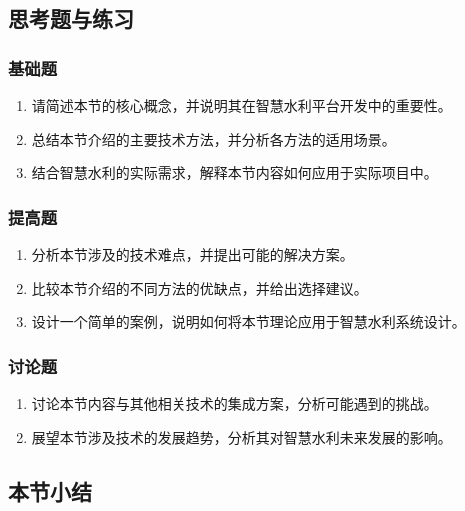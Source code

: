 \subsection{思考题与练习}\label{ux601dux8003ux9898ux4e0eux7ec3ux4e60}

\subsubsection{基础题}\label{ux57faux7840ux9898}

\begin{enumerate}
\def\labelenumi{\arabic{enumi}.}
\tightlist
\item
  请简述本节的核心概念，并说明其在智慧水利平台开发中的重要性。
\item
  总结本节介绍的主要技术方法，并分析各方法的适用场景。
\item
  结合智慧水利的实际需求，解释本节内容如何应用于实际项目中。
\end{enumerate}

\subsubsection{提高题}\label{ux63d0ux9ad8ux9898}

\begin{enumerate}
\def\labelenumi{\arabic{enumi}.}
\setcounter{enumi}{3}
\tightlist
\item
  分析本节涉及的技术难点，并提出可能的解决方案。
\item
  比较本节介绍的不同方法的优缺点，并给出选择建议。
\item
  设计一个简单的案例，说明如何将本节理论应用于智慧水利系统设计。
\end{enumerate}

\subsubsection{讨论题}\label{ux8ba8ux8bbaux9898}

\begin{enumerate}
\def\labelenumi{\arabic{enumi}.}
\setcounter{enumi}{6}
\tightlist
\item
  讨论本节内容与其他相关技术的集成方案，分析可能遇到的挑战。
\item
  展望本节涉及技术的发展趋势，分析其对智慧水利未来发展的影响。
\end{enumerate}

\subsection{本节小结}\label{ux672cux8282ux5c0fux7ed3}

